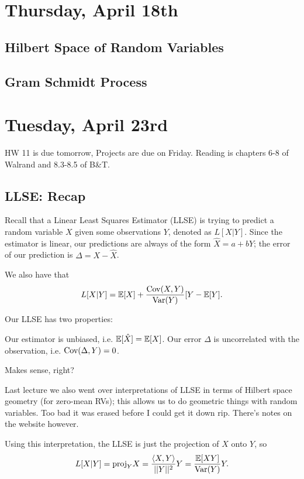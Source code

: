 \documentclass[11 pt]{scrartcl}
\begin{document}
\newpage
\section{Thursday, April 18th}

\subsection{Hilbert Space of Random Variables}

\subsection{Gram Schmidt Process}

\newpage
\section{Tuesday, April 23rd}
HW 11 is due tomorrow, Projects are due on Friday. Reading is chapters 6-8 of Walrand and 8.3-8.5 of B\&T. 

\subsection{LLSE: Recap}
Recall that a Linear Least Squares Estimator (LLSE) is trying to predict a random variable $X$ given some observations $Y$, denoted as $L[X|Y]$. Since the estimator is linear, our predictions are always of the form $\hat{X} = a + bY$; the error of our prediction is $\Delta = X - \hat{X}$. 

We also have that 
\[ L[X|Y] = \mathbb E[X] + \dfrac{\text{Cov}(X,Y)}{\text{Var}(Y)}[Y - \mathbb E[Y].\]

Our LLSE has two properties: 
\begin{enumerate}
    \ii Our estimator is unbiased, i.e. $\mathbb E[\hat{X}] = \mathbb E[X]$. 
    \ii Our error $\Delta$ is uncorrelated with the observation, i.e. $\text{Cov}(\Delta, Y) = 0$.
\end{enumerate}

Makes sense, right? 

Last lecture we also went over interpretations of LLSE in terms of Hilbert space geometry (for zero-mean RVs); this allows us to do geometric things with random variables. Too bad it was erased before I could get it down rip. There's notes on the website however.  

Using this interpretation, the LLSE is just the projection of $X$ onto $Y$, so 
\[ L[X|Y] = \text{proj}_{Y}X = \dfrac{\langle X,Y \rangle}{||Y||^2} Y = \dfrac{\mathbb E[XY]}{\text{Var}(Y)}Y.\] 
\end{document}
